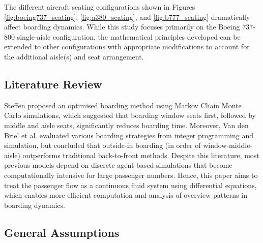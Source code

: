 \documentclass[12pt,a4paper]{article}
\begin{document}
The different aircraft seating configurations shown in Figures \ref{fig:boeing737_seating}, \ref{fig:a380_seating}, and \ref{fig:b777_seating} dramatically affect boarding dynamics. While this study focuses primarily on the Boeing 737-800 single-aisle configuration, the mathematical principles developed can be extended to other configurations with appropriate modifications to account for the additional aisle(s) and seat arrangement.

\subsection{Literature Review}

Steffen \cite{steffen2008} proposed an optimised boarding method using Markov Chain Monte Carlo simulations, which suggested that boarding window seats first, followed by middle and aisle seats, significantly reduces boarding time. Moreover, Van den Briel et al. \cite{vandenbriel2005} evaluated various boarding strategies from integer programming and simulation, but concluded that outside-in boarding (in order of window-middle-aisle) outperforms traditional back-to-front methods. Despite this literature, most previous models depend on discrete agent-based simulations that become computationally intensive for large passenger numbers. Hence, this paper aims to treat the passenger flow as a continuous fluid system using differential equations, which enables more efficient computation and analysis of overview patterns in boarding dynamics.

\subsection{General Assumptions}
\end{document}
